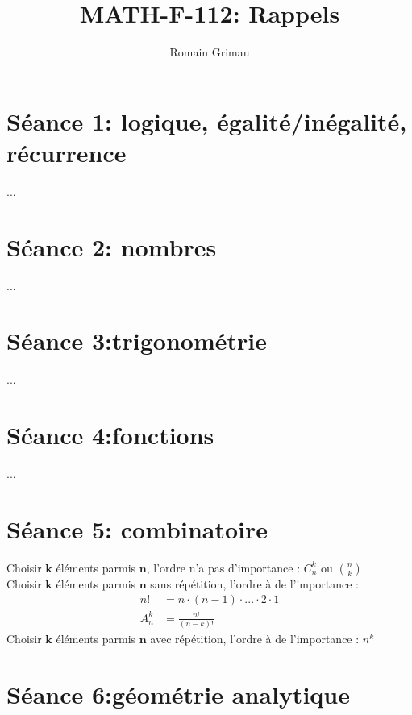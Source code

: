 \documentclass[12pt]{article}
\title{\textbf{MATH-F-112: Rappels}}
\author{Romain Grimau}
\date{}
\begin{document}
\maketitle

\section*{S\'eance 1: logique, \'egalit\'e/in\'egalit\'e, r\'ecurrence}
...
\section*{S\'eance 2: nombres}
...
\section*{S\'eance 3:trigonom\'etrie}
...
\section*{S\'eance 4:fonctions}
...
\section*{S\'eance 5: combinatoire}
Choisir $\textbf{k}$ \'el\'ements parmis $\textbf{n}$, l'ordre n'a pas d'importance : \(C_n^k\) ou \(\binom{n}{k}\) \\ \newline
\indent Choisir $\textbf{k}$ \'el\'ements parmis $\textbf{n}$ sans r\'ep\'etition, l'ordre \`a de l'importance :
\begin{align*}
    n! & =  n\cdot(n-1)\cdot ... \cdot2\cdot1 \\
    A_n^k & =  \frac{n!}{(n-k)!}
\end{align*}
\indent Choisir $\textbf{k}$ \'el\'ements parmis $\textbf{n}$ avec r\'ep\'etition, l'ordre \`a de l'importance : \(n^k\)
\section*{S\'eance 6:g\'eom\'etrie analytique}
\end{document}
